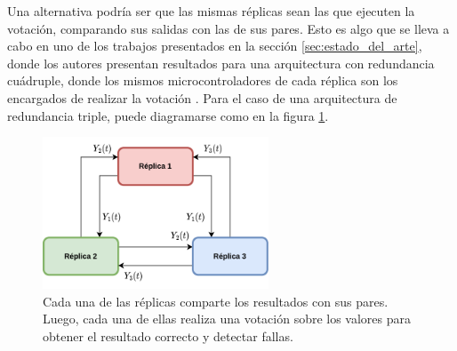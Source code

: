 
Una alternativa podría ser que las mismas réplicas sean las que ejecuten la votación, comparando sus salidas con las de sus pares. Esto es algo que se lleva a cabo en uno de los trabajos presentados en la sección \ref{sec:estado_del_arte}, donde los autores presentan resultados para una arquitectura con redundancia cuádruple, donde los mismos microcontroladores de cada réplica son los encargados de realizar la votación \cite{hiergeist2018implementation}.
Para el caso de una arquitectura de redundancia triple, puede diagramarse como en la figura \ref{fig:TMR_sin_arbitro}.


\begin{figure}[H]
    \centering
    \includegraphics[width=0.6\textwidth]{img/TMR_sin_arbitro.png}
    \caption{Cada una de las réplicas comparte los resultados con sus pares. Luego, cada una de ellas realiza una votación sobre los valores para obtener el resultado correcto y detectar fallas.}
    \label{fig:TMR_sin_arbitro}
\end{figure}

